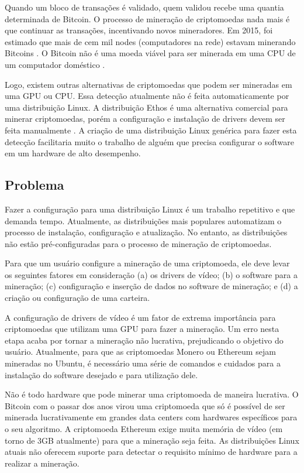 \documentclass[
article,			%
12pt,				%
openright,			%
oneside,			%
a4paper,			%
chapter=TITLE,		%
section=TITLE,		%
subsection=TITLE,	%
subsubsection=TITLE,%
subsubsubsection=TITLE, %
english,			%
brazil,				%
]{abntex2}
\begin{document}
Quando um bloco de transações é validado, quem validou recebe uma
quantia determinada de Bitcoin. O processo de mineração de
criptomoedas nada mais é que continuar as transações, incentivando
novos mineradores. Em 2015, foi estimado que mais de cem mil nodes
(computadores na rede) estavam minerando Bitcoins \cite{Coin2015}. O
Bitcoin não é uma moeda viável para ser minerada em uma CPU de um
computador doméstico \cite{Bitcoins2018}.

Logo, existem outras alternativas de criptomoedas que podem ser
mineradas em uma GPU ou CPU\@. Essa detecção atualmente não é feita
automaticamente por uma distribuição Linux. A distribuição Ethos é uma
alternativa comercial para minerar criptomoedas, porém a configuração
e instalação de drivers devem ser feita manualmente \cite{EthOS2018}.
A criação de uma distribuição Linux genérica para fazer esta detecção
facilitaria muito o trabalho de alguém que precisa configurar o
software em um hardware de alto desempenho.

\subsection{Problema}

Fazer a configuração para uma distribuição Linux é um trabalho
repetitivo e que demanda tempo. Atualmente, as distribuições mais
populares automatizam o processo de instalação, configuração e
atualização. No entanto, as distribuições não estão pré-configuradas
para o processo de mineração de criptomoedas.

Para que um usuário configure a mineração de uma criptomoeda, ele deve
levar os seguintes fatores em consideração (a) os drivers de vídeo;
(b) o software para a mineração; (c) configuração e inserção de dados
no software de mineração; e (d) a criação ou configuração de uma
carteira. 

A configuração de drivers de vídeo é um fator de extrema importância
para criptomoedas que utilizam uma GPU para fazer a mineração. Um erro
nesta etapa acaba por tornar a mineração não lucrativa, prejudicando o
objetivo do usuário. Atualmente, para que as criptomoedas Monero ou
Ethereum sejam mineradas no Ubuntu, é necessário uma série de comandos
e cuidados para a instalação do software desejado e para utilização
dele.

Não é todo hardware que pode minerar uma criptomoeda de maneira
lucrativa. O Bitcoin com o passar dos anos virou uma criptomoeda que
só é possível de ser minerada lucrativamente em grandes data centers
com hardwares específicos para o seu algoritmo. A criptomoeda Ethereum
exige muita memória de vídeo (em torno de 3GB atualmente) para que a
mineração seja feita. As distribuições Linux atuais não oferecem
suporte para detectar o requisito mínimo de hardware para a realizar a
mineração.
\end{document}
